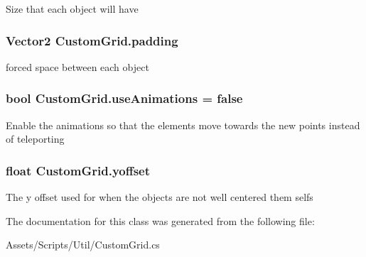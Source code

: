 Size that each object will have 

\subsubsection[{\texorpdfstring{padding}{padding}}]{\setlength{\rightskip}{0pt plus 5cm}Vector2 Custom\+Grid.\+padding}\hypertarget{class_custom_grid_aa1f53f156756dfe4d9d2795fe2c52754}{}\label{class_custom_grid_aa1f53f156756dfe4d9d2795fe2c52754}


forced space between each object 

\subsubsection[{\texorpdfstring{use\+Animations}{useAnimations}}]{\setlength{\rightskip}{0pt plus 5cm}bool Custom\+Grid.\+use\+Animations = false}\hypertarget{class_custom_grid_ae7281905d1114c2582f02d0d1badf53f}{}\label{class_custom_grid_ae7281905d1114c2582f02d0d1badf53f}


Enable the animations so that the elements move towards the new points instead of teleporting 

\subsubsection[{\texorpdfstring{yoffset}{yoffset}}]{\setlength{\rightskip}{0pt plus 5cm}float Custom\+Grid.\+yoffset}\hypertarget{class_custom_grid_aa07b1f547bdbef9d050b5f57d96f744a}{}\label{class_custom_grid_aa07b1f547bdbef9d050b5f57d96f744a}


The y offset used for when the objects are not well centered them selfs 



The documentation for this class was generated from the following file\+:\begin{DoxyCompactItemize}
\item 
Assets/\+Scripts/\+Util/Custom\+Grid.\+cs\end{DoxyCompactItemize}
